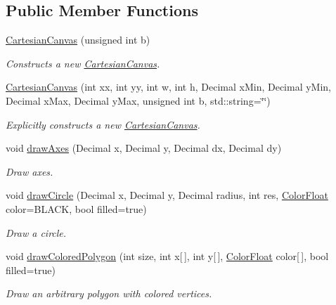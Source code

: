 \subsection*{Public Member Functions}
\begin{DoxyCompactItemize}
\item 
\hyperlink{class_cartesian_canvas_ab4387f0226721981adf82ee150751ce0}{Cartesian\+Canvas} (unsigned int b)
\begin{DoxyCompactList}\small\item\em Constructs a new \hyperlink{class_cartesian_canvas}{Cartesian\+Canvas}. \end{DoxyCompactList}\item 
\hyperlink{class_cartesian_canvas_ad9a52e5b74df4f6910eb3a2bbac190bf}{Cartesian\+Canvas} (int xx, int yy, int w, int h, Decimal x\+Min, Decimal y\+Min, Decimal x\+Max, Decimal y\+Max, unsigned int b, std\+::string=\char`\"{}\char`\"{})
\begin{DoxyCompactList}\small\item\em Explicitly constructs a new \hyperlink{class_cartesian_canvas}{Cartesian\+Canvas}. \end{DoxyCompactList}\item 
void \hyperlink{class_cartesian_canvas_a24ff3802f7f82e6f8b89993346e50408}{draw\+Axes} (Decimal x, Decimal y, Decimal dx, Decimal dy)
\begin{DoxyCompactList}\small\item\em Draw axes. \end{DoxyCompactList}\item 
void \hyperlink{class_cartesian_canvas_a9acc954ccb5a9df491db2e8481b58b03}{draw\+Circle} (Decimal x, Decimal y, Decimal radius, int res, \hyperlink{struct_color_float}{Color\+Float} color=B\+L\+A\+C\+K, bool filled=true)
\begin{DoxyCompactList}\small\item\em Draw a circle. \end{DoxyCompactList}\item 
void \hyperlink{class_cartesian_canvas_aa80eb5c58be2461f76a02d0acc94811b}{draw\+Colored\+Polygon} (int size, int x\mbox{[}$\,$\mbox{]}, int y\mbox{[}$\,$\mbox{]}, \hyperlink{struct_color_float}{Color\+Float} color\mbox{[}$\,$\mbox{]}, bool filled=true)
\begin{DoxyCompactList}\small\item\em Draw an arbitrary polygon with colored vertices. \end{DoxyCompactList}\item 

\end{DoxyCompactItemize}
